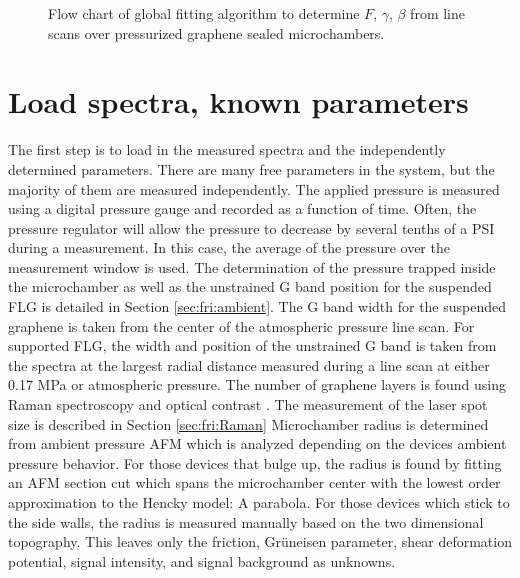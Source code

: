 \begin{figure}
	\begin{center}
	
	\end{center}
	\caption[Flow chart of global fitting algorithm]{\label{fig:Fit:Flow}Flow chart of global fitting algorithm to determine $F$, $\gamma$, $\beta$ from line scans over pressurized graphene sealed microchambers.}
\end{figure}

\section*{Load spectra, known parameters}
The first step is to load in the measured spectra and the independently determined parameters.
There are many free parameters in the system, but the majority of them are measured independently.
The applied pressure is measured using a digital pressure gauge and recorded as a function of time.
Often, the pressure regulator will allow the pressure to decrease by several tenths of a PSI during a measurement.
In this case, the average of the pressure over the measurement window is used.
The determination of the pressure trapped inside the microchamber as well as the unstrained G band position for the suspended FLG is detailed in Section \ref{sec:fri:ambient}.
The G band width for the suspended graphene is taken from the center of the atmospheric pressure line scan.
For supported FLG, the width and position of the unstrained G band is taken from the spectra at the largest radial distance measured during a line scan at either 0.17 MPa or atmospheric pressure.
The number of graphene layers is found using Raman spectroscopy \cite{Ferrari2006} and optical contrast \cite{Blake2007,Casiraghi2007a}.
The measurement of the laser spot size is described in Section \ref{sec:fri:Raman}
Microchamber radius is determined from ambient pressure AFM which is analyzed depending on the devices ambient pressure behavior.
For those devices that bulge up, the radius is found by fitting an AFM section cut which spans the microchamber center with the lowest order approximation to the Hencky model: A parabola.
For those devices which stick to the side walls, the radius is measured manually based on the two dimensional topography.
This leaves only the friction, Gr\"{u}neisen parameter, shear deformation potential, signal intensity, and signal background as unknowns.

